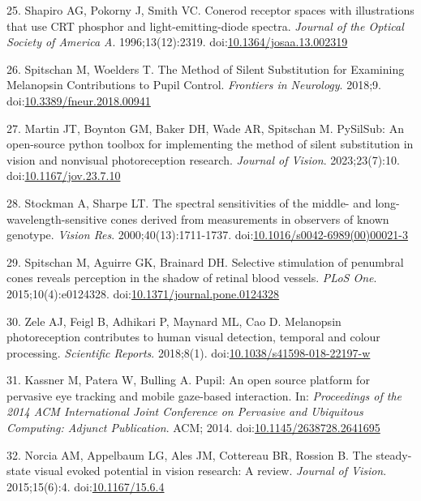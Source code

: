 \documentclass[
]{article}
\begin{document}
\leavevmode\hypertarget{ref-Shapiro1996}{}%
25. Shapiro AG, Pokorny J, Smith VC. Conerod receptor spaces with illustrations that use CRT phosphor and light-emitting-diode spectra. \emph{Journal of the Optical Society of America A}. 1996;13(12):2319. doi:\href{https://doi.org/10.1364/josaa.13.002319}{10.1364/josaa.13.002319}

\leavevmode\hypertarget{ref-Spitschan2018}{}%
26. Spitschan M, Woelders T. The Method of Silent Substitution for Examining Melanopsin Contributions to Pupil Control. \emph{Frontiers in Neurology}. 2018;9. doi:\href{https://doi.org/10.3389/fneur.2018.00941}{10.3389/fneur.2018.00941}

\leavevmode\hypertarget{ref-Martin2023}{}%
27. Martin JT, Boynton GM, Baker DH, Wade AR, Spitschan M. PySilSub: An open-source python toolbox for implementing the method of silent substitution in vision and nonvisual photoreception research. \emph{Journal of Vision}. 2023;23(7):10. doi:\href{https://doi.org/10.1167/jov.23.7.10}{10.1167/jov.23.7.10}

\leavevmode\hypertarget{ref-Stockman2000}{}%
28. Stockman A, Sharpe LT. The spectral sensitivities of the middle- and long-wavelength-sensitive cones derived from measurements in observers of known genotype. \emph{Vision Res}. 2000;40(13):1711-1737. doi:\href{https://doi.org/10.1016/s0042-6989(00)00021-3}{10.1016/s0042-6989(00)00021-3}

\leavevmode\hypertarget{ref-Spitschan2015}{}%
29. Spitschan M, Aguirre GK, Brainard DH. Selective stimulation of penumbral cones reveals perception in the shadow of retinal blood vessels. \emph{PLoS One}. 2015;10(4):e0124328. doi:\href{https://doi.org/10.1371/journal.pone.0124328}{10.1371/journal.pone.0124328}

\leavevmode\hypertarget{ref-Zele2018}{}%
30. Zele AJ, Feigl B, Adhikari P, Maynard ML, Cao D. Melanopsin photoreception contributes to human visual detection, temporal and colour processing. \emph{Scientific Reports}. 2018;8(1). doi:\href{https://doi.org/10.1038/s41598-018-22197-w}{10.1038/s41598-018-22197-w}

\leavevmode\hypertarget{ref-Kassner2014}{}%
31. Kassner M, Patera W, Bulling A. Pupil: An open source platform for pervasive eye tracking and mobile gaze-based interaction. In: \emph{Proceedings of the 2014 ACM International Joint Conference on Pervasive and Ubiquitous Computing: Adjunct Publication}. ACM; 2014. doi:\href{https://doi.org/10.1145/2638728.2641695}{10.1145/2638728.2641695}

\leavevmode\hypertarget{ref-Norcia2015}{}%
32. Norcia AM, Appelbaum LG, Ales JM, Cottereau BR, Rossion B. The steady-state visual evoked potential in vision research: A review. \emph{Journal of Vision}. 2015;15(6):4. doi:\href{https://doi.org/10.1167/15.6.4}{10.1167/15.6.4}
\end{document}
